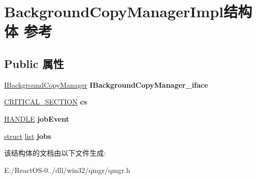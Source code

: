 \hypertarget{struct_background_copy_manager_impl}{}\section{Background\+Copy\+Manager\+Impl结构体 参考}
\label{struct_background_copy_manager_impl}
\subsection*{Public 属性}
\begin{DoxyCompactItemize}
\item 
\mbox{\label{struct_background_copy_manager_impl_a38a9b1359caf85b26f583601711a158f}} 
\hyperlink{interface_i_background_copy_manager}{I\+Background\+Copy\+Manager} {\bfseries I\+Background\+Copy\+Manager\+\_\+iface}
\item 
\mbox{\label{struct_background_copy_manager_impl_a7191d7a7c7caa9578891214e7cd2a295}} 
\hyperlink{struct___c_r_i_t_i_c_a_l___s_e_c_t_i_o_n}{C\+R\+I\+T\+I\+C\+A\+L\+\_\+\+S\+E\+C\+T\+I\+ON} {\bfseries cs}
\item 
\mbox{\label{struct_background_copy_manager_impl_af3a5f092237402a0f1917f36ce671af0}} 
\hyperlink{interfacevoid}{H\+A\+N\+D\+LE} {\bfseries job\+Event}
\item 
\mbox{\label{struct_background_copy_manager_impl_a376b3bfd6a669420956a64ec96144bf5}} 
\hyperlink{interfacestruct}{struct} \hyperlink{classlist}{list} {\bfseries jobs}
\end{DoxyCompactItemize}


该结构体的文档由以下文件生成\+:\begin{DoxyCompactItemize}
\item 
E\+:/\+React\+O\+S-\/0../dll/win32/qmgr/qmgr.\+h\end{DoxyCompactItemize}
